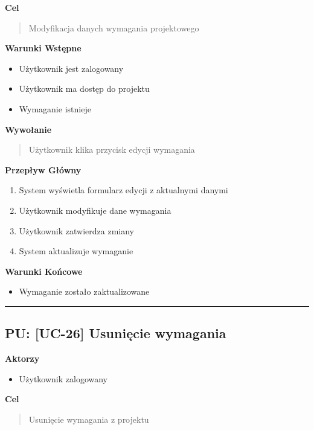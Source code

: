 \vspace{0.2cm}
\noindent\textbf{Cel}
\begin{quote}
    Modyfikacja danych wymagania projektowego
\end{quote}

\vspace{0.2cm}
\noindent\textbf{Warunki Wstępne}
\begin{itemize}
    \item Użytkownik jest zalogowany
    \item Użytkownik ma dostęp do projektu
    \item Wymaganie istnieje
\end{itemize}

\vspace{0.2cm}
\noindent\textbf{Wywołanie}
\begin{quote}
    Użytkownik klika przycisk edycji wymagania
\end{quote}

\vspace{0.2cm}
\noindent\textbf{Przepływ Główny}
\begin{enumerate}
    \item System wyświetla formularz edycji z aktualnymi danymi
    \item Użytkownik modyfikuje dane wymagania
    \item Użytkownik zatwierdza zmiany
    \item System aktualizuje wymaganie
\end{enumerate}

\vspace{0.2cm}
\noindent\textbf{Warunki Końcowe}
\begin{itemize}
    \item Wymaganie zostało zaktualizowane
\end{itemize}


\hrule
\vspace{1cm}

\subsection*{PU: [UC-26] Usunięcie wymagania}

\noindent\textbf{Aktorzy}
\begin{itemize}
    \item Użytkownik zalogowany
\end{itemize}

\vspace{0.2cm}
\noindent\textbf{Cel}
\begin{quote}
    Usunięcie wymagania z projektu
\end{quote}

